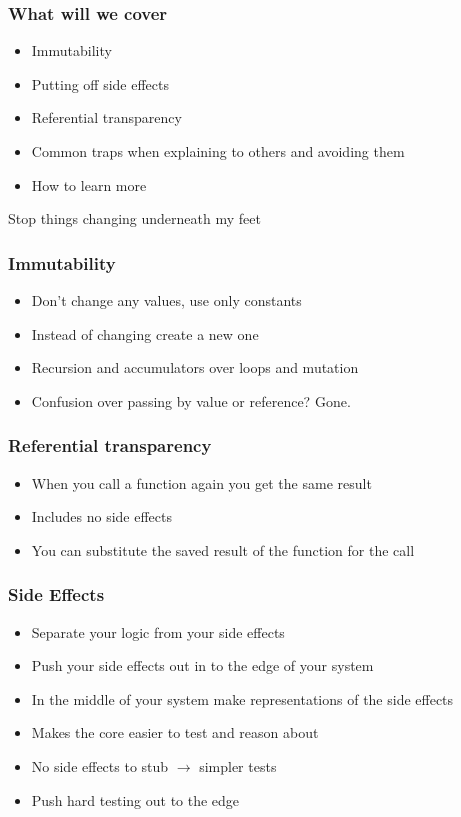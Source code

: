\documentclass{beamer}
\begin{document}
\begin{frame}
\frametitle{What will we cover}
\begin{itemize}
  \item Immutability
  \item Putting off side effects
  \item Referential transparency
  \item Common traps when explaining to others and avoiding them
  \item How to learn more
\end{itemize}
\end{frame}

\begin{frame}
\begin{center}
\Huge Stop things changing underneath my feet
\end{center}
\end{frame}

\begin{frame}
\frametitle{Immutability}
\begin{itemize}
\item Don't change any values, use only constants
\item Instead of changing create a new one
\item Recursion and accumulators over loops and mutation
\item Confusion over passing by value or reference? Gone.
\end{itemize}
\end{frame}

\begin {frame}
\frametitle{Referential transparency}
\begin{itemize}
\item When you call a function again you get the same result
\item Includes no side effects
\item You can substitute the saved result of the function for the call
\end{itemize}
\end{frame}

\begin{frame}
\frametitle{Side Effects}
\begin{itemize}
\item Separate your logic from your side effects
\item Push your side effects out in to the edge of your system
\item In the middle of your system make representations of the side effects
\item Makes the core easier to test and reason about
\item No side effects to stub $\rightarrow$ simpler tests
\item Push hard testing out to the edge
\end{itemize}
\end{frame}
\end{document}
